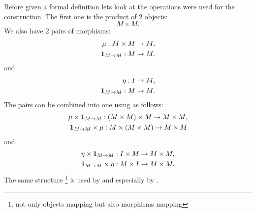 Before given a formal definition lets look at the operations were used
for the construction. The first one is the product of 2 objects:
\[
M \times M.
\]
We also have 2 pairs of morphisms:
\begin{eqnarray}
\mu: M \times M \to M,
\nonumber \\
\mathbf{1}_{ M \to M }: M \to M.
\nonumber
\end{eqnarray}
and
\begin{eqnarray}
\eta: I \to M, 
\nonumber \\
\mathbf{1}_{ M \to M }: M \to M.
\nonumber
\end{eqnarray}
The pairs can be combined into one using
 as follows:
\begin{eqnarray}
\mu \times \mathbf{1}_{ M \to M }: \left(M \times M\right) \times M \to M \times M,
\nonumber \\
\mathbf{1}_{ M \to M } \times \mu: M \times \left(M \times M\right) \to M \times M
\nonumber
\end{eqnarray}
and
\begin{eqnarray}
\eta \times \mathbf{1}_{ M \to M }: I \times M \to M \times M,
\nonumber \\
\mathbf{1}_{ M \to M } \times \eta: M \times I \to M \times M.
\nonumber
\end{eqnarray}
The same structure 
\footnote{not only objects mapping but also morphisms mapping}
is used by
and
especially by .  

